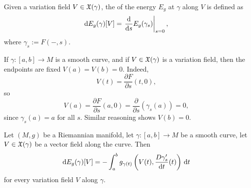
\lecture{}

\begin{definition}
Given a variation field $V\in\mathfrak{X}(\gamma)$, the 
of the energy $E_{g}$ at $\gamma$ along $V$ is defined as
\begin{equation}
\mathrm{d} E_{g}(\gamma)[V]=\left.\frac{\mathrm{d}}{\mathrm{d} s}E_{g}(\gamma_{s})\right|_{s=0},
\end{equation}
where $\gamma_{s}:=F(-,s)$.
\end{definition}

\begin{remark}
If $\gamma\colon[a,b]\to M$ is a smooth curve, and if
$V\in\mathfrak{X}(\gamma)$ is a variation field, then the endpoints are fixed $V(a)=V(b)=0$.
Indeed,
\begin{equation}
V(t)=\frac{\partial F}{\partial s}(t,0),
\end{equation}
so
\begin{equation}
V(a)=\frac{\partial F}{\partial s}(a,0)=\frac{\partial}{\partial s}(\gamma_{s}(a))=0,
\end{equation}
since $\gamma_{s}(a)=a$ for all $s$. Similar reasoning shows $V(b)=0$.
\end{remark}

\begin{theorem}
Let $(M,g)$ be a Riemannian manifold, let $\gamma\colon[a,b]\to M$ be
a smooth curve, let $V\in\mathfrak{X}(\gamma)$ be a vector field along the
curve. Then
\begin{equation}
\mathrm{d} E_{g}(\gamma)[V] =
-\int^{b}_{a}g_{\gamma(t)}\left(V(t),\frac{D\gamma_{s}'}{\mathrm{d} t}(t)\right)\,\mathrm{d} t
\end{equation}
for every variation field $V$ along $\gamma$.
\end{theorem}

